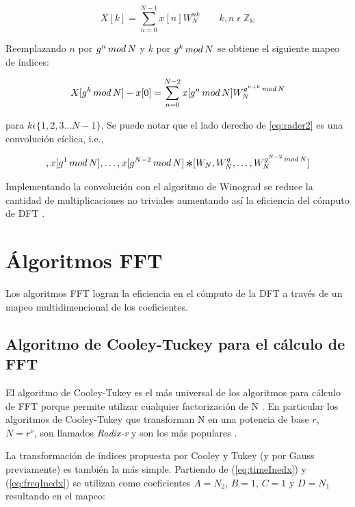  \begin{equation}
	X[k] = \sum_{n=0}^{N-1}x[n]W_{N}^{nk} \qquad k,n \; \displaystyle\epsilon \;
	\mathbb{Z_N}
\label{eq:rader1}
\end{equation}

Reemplazando $n$ por $g^n \thinspace mod \thinspace N$ y $k$ por $g^k \thinspace mod \thinspace N$
se obtiene el siguiente mapeo de índices:

\begin{equation}
	X[g^k \thinspace mod \thinspace N] - x[0] = \sum_{n=0}^{N-2}x[g^n \thinspace mod \thinspace N]
	W_{N}^{g^{n+k} \thinspace mod \thinspace N}
\label{eq:rader2}
\end{equation}

para $k \epsilon \{1,2,3 \ldots N-1\}$. Se puede notar que el lado derecho de \ref{eq:rader2} es una
convolución cíclica, i.e.,

\begin{equation}
	[x[g^0 \thinspace mod \thinspace N], x[g^1 \thinspace mod \thinspace N], \ldots, x[g^{N-2}
	\thinspace mod \thinspace N] \Conv [W_N, W_N^g, \ldots, W_N^{g^{N-2}
	\thinspace mod \thinspace N}]
\label{eq:rader2}
\end{equation}

Implementando la convolución con el algoritmo de Winograd se reduce la cantidad de multiplicaciones
no triviales aumentando así la eficiencia del cómputo de DFT \cite{WinoConv}.

\section{Álgoritmos FFT}

Los algoritmos FFT logran la eficiencia en el cómputo de la DFT a través de un mapeo
multidimencional de los coeficientes.

\subsection{Algoritmo de Cooley-Tuckey para el cálculo de FFT}

El algoritmo de Cooley-Tukey es el más universal de los algoritmos para cálculo
de FFT porque permite utilizar cualquier factorización de N \cite{Meyer2_2}. En particular
los algoritmos de Cooley-Tukey que transforman N en una potencia de base $r$,
$N=r^\nu$, son llamados \emph{Radix-r} y son los más populares \cite{Meyer2_2}.

La transformación de índices propuesta por Cooley y Tukey (y por Gauss
previamente) es también la más simple. Partiendo de
(\ref{eq:timeInedx}) y (\ref{eq:freqInedx}) se utilizan como coeficientes
$A=N_2$, $B=1$, $C=1$ y $D=N_1$ resultando en el mapeo:


